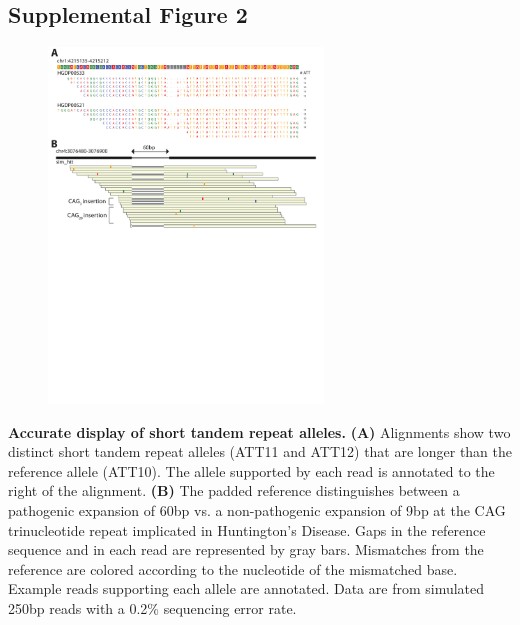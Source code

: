\subsection{Supplemental Figure 2}
\begin{figure}[h!]
\centering
\label{fig:pbvsup2}
\includegraphics[width=0.65\textwidth]{Figures/App2/SuppFig2.pdf}
\end{figure}
\textbf{Accurate display of short tandem repeat alleles.} \textbf{(A)} Alignments show two distinct short tandem repeat alleles (ATT11 and ATT12) that are longer than the reference allele (ATT10). The allele supported by each read is annotated to the right of the alignment. \textbf{(B)} The padded reference distinguishes between a pathogenic expansion of 60bp vs. a non-pathogenic expansion of 9bp at the CAG trinucleotide repeat implicated in Huntington's Disease. Gaps in the reference sequence and in each read are represented by gray bars. Mismatches from the reference are colored according to the nucleotide of the mismatched base. Example reads supporting each allele are annotated. Data are from simulated 250bp reads with a 0.2\% sequencing error rate. 

\pagebreak
